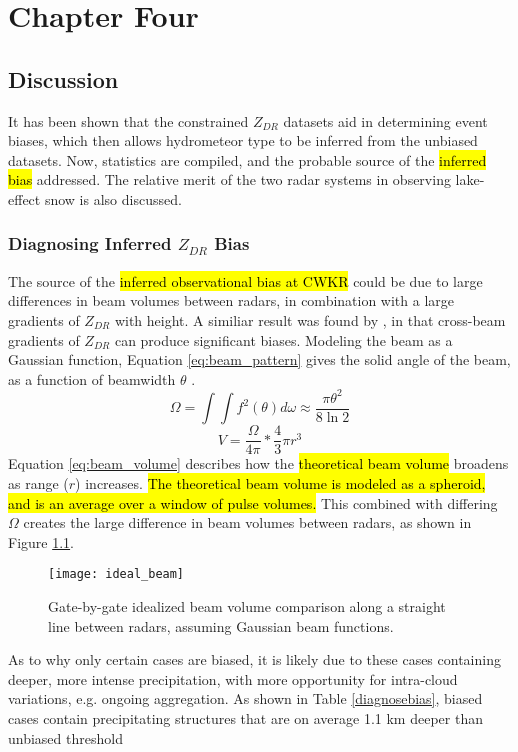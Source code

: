 \chapter{Chapter Four}
\section{Discussion}
It has been shown that the constrained $Z_{DR}$ datasets aid in determining event biases, which then allows hydrometeor type to be inferred from the unbiased
datasets. Now, statistics are compiled, and the probable source of the \hl{inferred bias} addressed. The relative merit of the two radar systems in observing lake-effect
snow is also discussed.
\subsection{Diagnosing Inferred $Z_{DR}$ Bias}
The source of the \hl{inferred observational bias at CWKR} could be due to large differences in beam volumes between radars, in combination with a large gradients of $Z_{DR}$ with height. A similiar result was found by \citep{Ryzhkov2007a}, in that cross-beam gradients of $Z_{DR}$ can produce significant biases. Modeling the beam as a Gaussian function, Equation \ref{eq:beam_pattern} gives the solid angle of the beam, as a function of beamwidth $\theta$ \citep{Probert1962}. 
\begin{equation}\label{eq:beam_pattern}
\Omega = \int \int f^{2}(\theta) d\omega \approx \frac{\pi \theta^{2}}{8 \ln 2}
\end{equation}
\begin{equation}\label{eq:beam_volume}
V = \frac{\Omega}{4\pi} * \frac{4}{3} \pi r^{3}
\end{equation}
 Equation \ref{eq:beam_volume} describes how the \hl{theoretical beam volume} broadens as range ($r$) increases. \hl{The theoretical beam volume is modeled as a spheroid, and is an average over a window of pulse volumes.} This combined with 
 differing $\Omega$ creates the large difference in beam volumes between radars, as shown in Figure \ref{fig:ideal_beam}.
\begin{figure}[H]
\centering
\texttt{[image: ideal\_beam]}
\caption{Gate-by-gate idealized beam volume comparison along a straight line between radars, assuming Gaussian beam functions.} 
\label{fig:ideal_beam}
\end{figure}
 As to why only certain cases are biased, it is likely due to these cases containing deeper, more intense 
 precipitation, with more opportunity for intra-cloud variations, e.g. ongoing aggregation. As shown in Table \ref{diagnosebias}, biased cases contain precipitating structures that are on average 1.1 km deeper than unbiased threshold
